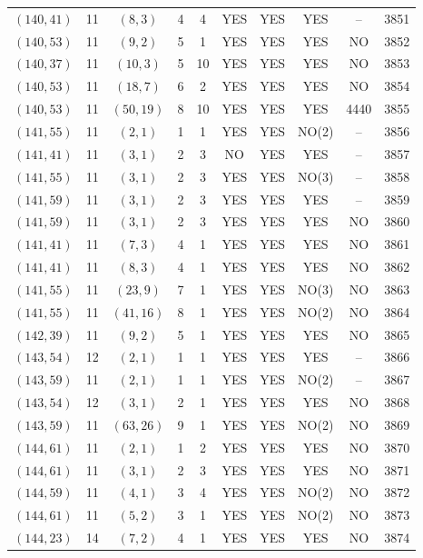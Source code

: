 \begin{longtable}{|c|c|c|c|c|c|c|c|c|c|}
$(140, 41)$ & 11 & $(8, 3)$ & 4 & 4 & YES & YES & YES & -- & 3851\\
$(140, 53)$ & 11 & $(9, 2)$ & 5 & 1 & YES & YES & YES & NO & 3852\\
$(140, 37)$ & 11 & $(10, 3)$ & 5 & 10 & YES & YES & YES & NO & 3853\\
$(140, 53)$ & 11 & $(18, 7)$ & 6 & 2 & YES & YES & YES & NO & 3854\\
$(140, 53)$ & 11 & $(50, 19)$ & 8 & 10 & YES & YES & YES & 4440 & 3855\\
$(141, 55)$ & 11 & $(2, 1)$ & 1 & 1 & YES & YES & NO(2) & -- & 3856\\
$(141, 41)$ & 11 & $(3, 1)$ & 2 & 3 & NO & YES & YES & -- & 3857\\
$(141, 55)$ & 11 & $(3, 1)$ & 2 & 3 & YES & YES & NO(3) & -- & 3858\\
$(141, 59)$ & 11 & $(3, 1)$ & 2 & 3 & YES & YES & YES & -- & 3859\\
$(141, 59)$ & 11 & $(3, 1)$ & 2 & 3 & YES & YES & YES & NO & 3860\\
$(141, 41)$ & 11 & $(7, 3)$ & 4 & 1 & YES & YES & YES & NO & 3861\\
$(141, 41)$ & 11 & $(8, 3)$ & 4 & 1 & YES & YES & YES & NO & 3862\\
$(141, 55)$ & 11 & $(23, 9)$ & 7 & 1 & YES & YES & NO(3) & NO & 3863\\
$(141, 55)$ & 11 & $(41, 16)$ & 8 & 1 & YES & YES & NO(2) & NO & 3864\\
$(142, 39)$ & 11 & $(9, 2)$ & 5 & 1 & YES & YES & YES & NO & 3865\\
$(143, 54)$ & 12 & $(2, 1)$ & 1 & 1 & YES & YES & YES & -- & 3866\\
$(143, 59)$ & 11 & $(2, 1)$ & 1 & 1 & YES & YES & NO(2) & -- & 3867\\
$(143, 54)$ & 12 & $(3, 1)$ & 2 & 1 & YES & YES & YES & NO & 3868\\
$(143, 59)$ & 11 & $(63, 26)$ & 9 & 1 & YES & YES & NO(2) & NO & 3869\\
$(144, 61)$ & 11 & $(2, 1)$ & 1 & 2 & YES & YES & YES & NO & 3870\\
$(144, 61)$ & 11 & $(3, 1)$ & 2 & 3 & YES & YES & YES & NO & 3871\\
$(144, 59)$ & 11 & $(4, 1)$ & 3 & 4 & YES & YES & NO(2) & NO & 3872\\
$(144, 61)$ & 11 & $(5, 2)$ & 3 & 1 & YES & YES & NO(2) & NO & 3873\\
$(144, 23)$ & 14 & $(7, 2)$ & 4 & 1 & YES & YES & YES & NO & 3874\\

\end{longtable}
